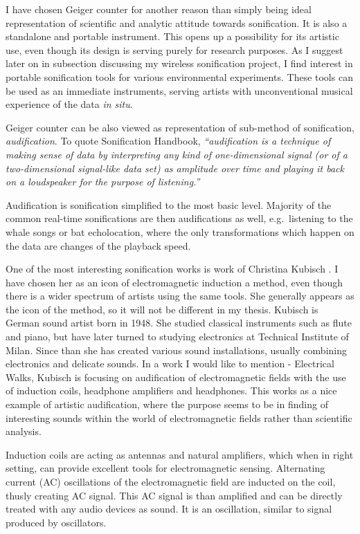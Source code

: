 \documentclass[12pt,a4paper,oneside]{report}
\begin{document}
I have chosen Geiger counter for another reason than simply being ideal representation of scientific and analytic attitude towards sonification. It is also a standalone and portable instrument. This opens up a possibility for its artistic use, even though its design is serving purely for research purposes. As I suggest later on in subsection discussing my wireless sonification project, I find interest in portable sonification tools for various environmental experiments. These tools can be used as an immediate instruments, serving artists with unconventional musical experience of the data \emph{in situ}.  

Geiger counter can be also viewed as representation of sub-method of sonification, \emph{audification}. To quote Sonification Handbook,  \emph{``audification is a technique of making sense of data by interpreting any kind of one-dimensional signal (or of a two-dimensional signal-like data set) as amplitude over time and playing it back on a loudspeaker for the purpose of listening.''} \cite[p.~301]{audif}

Audification is sonification simplified to the most basic level. Majority of the common real-time sonifications are then audifications as well, e.g.\ listening to the whale songs or bat echolocation, where the only transformations which happen on the data are changes of the playback speed.

One of the most interesting sonification works is work of Christina Kubisch \cite{ChKubisch2012}. I have chosen her as an icon of electromagnetic induction a method, even though there is a wider spectrum of artists using the same tools. She generally appears as the icon of the method, so it will not be different in my thesis. Kubisch is German sound artist born in 1948. She studied classical instruments such as flute and piano, but have later turned to studying electronics at Technical Institute of Milan. Since than she has created various sound installations, usually combining electronics and delicate sounds. In a work I would like to mention - Electrical Walks, Kubisch is focusing on audification of electromagnetic fields with the use of induction coils, headphone amplifiers and headphones. This works as a nice example of artistic audification, where the purpose seems to be in finding of interesting sounds within the world of electromagnetic fields rather than scientific analysis. 

Induction coils are acting as antennas and natural amplifiers, which when in right setting, can provide excellent tools for electromagnetic sensing. Alternating current (AC) oscillations of the electromagnetic field are inducted on the coil, thusly creating AC signal. This AC signal is than amplified and can be directly treated with any audio devices as sound. It is an oscillation, similar to signal produced by oscillators.
\end{document}
